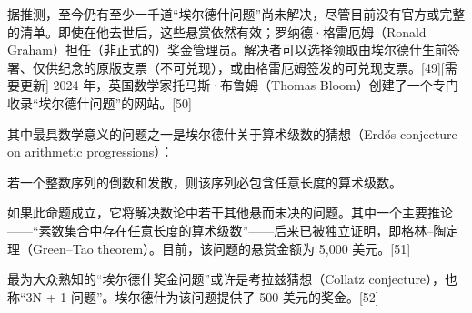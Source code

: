 据推测，至今仍有至少一千道“埃尔德什问题”尚未解决，尽管目前没有官方或完整的清单。即使在他去世后，这些悬赏依然有效；罗纳德·格雷厄姆（Ronald Graham）担任（非正式的）奖金管理员。解决者可以选择领取由埃尔德什生前签署、仅供纪念的原版支票（不可兑现），或由格雷厄姆签发的可兑现支票。[49][需要更新] 2024 年，英国数学家托马斯·布鲁姆（Thomas Bloom）创建了一个专门收录“埃尔德什问题”的网站。[50]

其中最具数学意义的问题之一是埃尔德什关于算术级数的猜想（Erdős conjecture on arithmetic progressions）：

若一个整数序列的倒数和发散，则该序列必包含任意长度的算术级数。

如果此命题成立，它将解决数论中若干其他悬而未决的问题。其中一个主要推论——“素数集合中存在任意长度的算术级数”——后来已被独立证明，即格林–陶定理（Green–Tao theorem）。目前，该问题的悬赏金额为 5,000 美元。[51]

最为大众熟知的“埃尔德什奖金问题”或许是考拉兹猜想（Collatz conjecture），也称“3N + 1 问题”。埃尔德什为该问题提供了 500 美元的奖金。[52]
